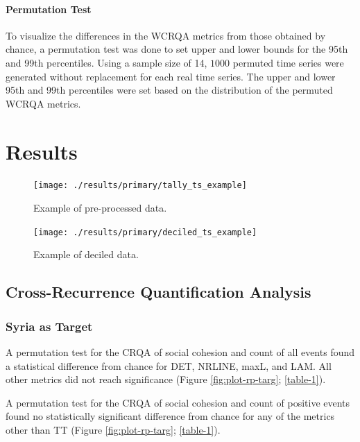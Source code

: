 \documentclass[
  english,
  man]{apa6}
\let\oldparagraph\paragraph
\renewcommand{\paragraph}[1]{\oldparagraph{#1}\mbox{}}
\begin{document}
\hypertarget{permutation-test-1}{%
\paragraph{Permutation Test}\label{permutation-test-1}}

To visualize the differences in the WCRQA metrics from those obtained by chance,
a permutation test was done to set upper and lower bounds for the 95th and 99th
percentiles. Using a sample size of 14, \(1000\) permuted time series were
generated without replacement for each real time series. The upper and lower
95th and 99th percentiles were set based on the distribution of the permuted
WCRQA metrics.

\hypertarget{results}{%
\section{Results}\label{results}}

\begin{figure}
\texttt{[image: ./results/primary/tally\_ts\_example]} \caption{Example of pre-processed data.}\label{fig:raw-ts}
\end{figure}

\begin{figure}
\texttt{[image: ./results/primary/deciled\_ts\_example]} \caption{Example of deciled data.}\label{fig:deciled-ts}
\end{figure}

\hypertarget{cross-recurrence-quantification-analysis-1}{%
\subsection{Cross-Recurrence Quantification Analysis}\label{cross-recurrence-quantification-analysis-1}}

\hypertarget{syria-as-target}{%
\subsubsection{Syria as Target}\label{syria-as-target}}

A permutation test for the CRQA of social cohesion and count of all events found
a statistical difference from chance for DET, NRLINE, maxL, and LAM. All other
metrics did not reach significance (Figure \ref{fig:plot-rp-targ};
\autoref{table-1}).

A permutation test for the CRQA of social cohesion and count of positive events
found no statistically significant difference from chance for any of the metrics
other than TT (Figure \ref{fig:plot-rp-targ}; \autoref{table-1}).
\end{document}
